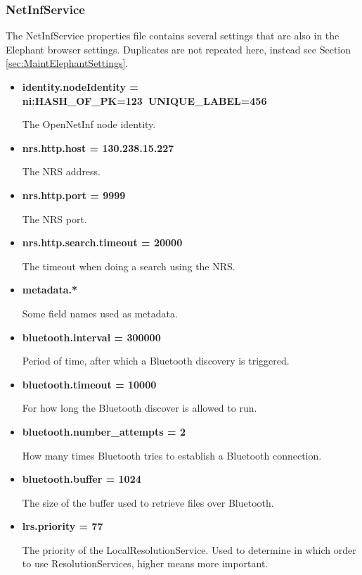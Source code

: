 \subsubsection{NetInfService}

The NetInfService properties file contains several settings that are also in the Elephant browser settings. 
Duplicates are not repeated here, instead see Section \ref{sec:MaintElephantSettings}.

\begin{itemize}
	\item {\bf identity.nodeIdentity = ni:HASH\_OF\_PK=123~UNIQUE\_LABEL=456}
	
	The OpenNetInf node identity.
	
	\item {\bf nrs.http.host = 130.238.15.227}
	
	The NRS address.
	
	\item {\bf nrs.http.port = 9999}	
	
	The NRS port.
	
	\item {\bf nrs.http.search.timeout = 20000}	
	
	The timeout when doing a search using the NRS.
	
	\item {\bf metadata.*}
	
	Some field names used as metadata.
	
	\item{\bf bluetooth.interval = 300000}
	
	Period of time, after which a Bluetooth discovery is triggered.
	
	\item{\bf bluetooth.timeout = 10000}
	
	For how long the Bluetooth discover is allowed to run.
	
	\item{\bf bluetooth.number\_attempts = 2}
	
	How many times Bluetooth tries to establish a Bluetooth connection.
	
	\item{\bf bluetooth.buffer = 1024}
	
	The size of the buffer used to retrieve files over Bluetooth.
	
	\item{\bf lrs.priority = 77}
	
	The priority of the LocalResolutionService. Used to determine in which order to use ResolutionServices, higher means more important.
	

\end{itemize}

